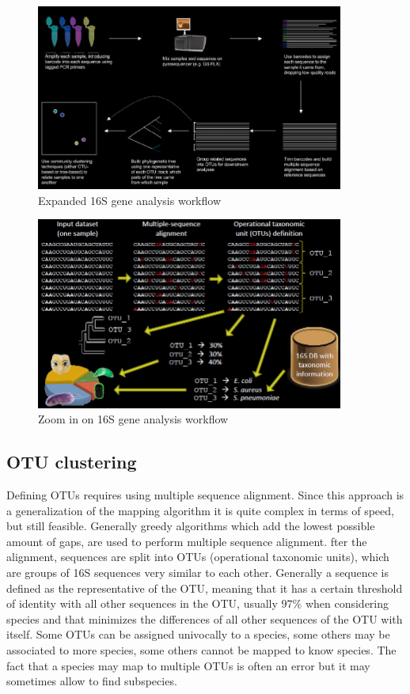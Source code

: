     \begin{figure}[!h]
      \centering
      \includegraphics[width=0.9\textwidth]{expanded_workflow.png}
      \caption{\label{fig:expanded_workflow}Expanded 16S gene analysis workflow}
    \end{figure}

    \begin{figure}[!h]
      \centering
      \includegraphics[width=0.9\textwidth]{zoom_in_16S.png}
      \caption{\label{fig:zoom_in_16S}Zoom in on 16S gene analysis workflow}
    \end{figure}

  \subsection{OTU clustering}
  Defining OTUs requires using multiple sequence alignment.
  Since this approach is a generalization of the mapping algorithm it is quite complex in terms of speed, but still feasible.
  Generally greedy algorithms which add the lowest possible amount of gaps, are used to perform multiple sequence alignment.
  fter the alignment, sequences are split into OTUs (operational taxonomic units), which are groups of 16S sequences very similar to each other.
  Generally a sequence is defined as the representative of the OTU, meaning that it has a certain threshold of identity with all other sequences in the OTU, usually $97\%$ when considering species and that minimizes the differences of all other sequences of the OTU with itself.
  Some OTUs can be assigned univocally to a species, some others may be associated to more species, some others cannot be mapped to know species.
  The fact that a species may map to multiple OTUs is often an error but it may sometimes allow to find subspecies.

